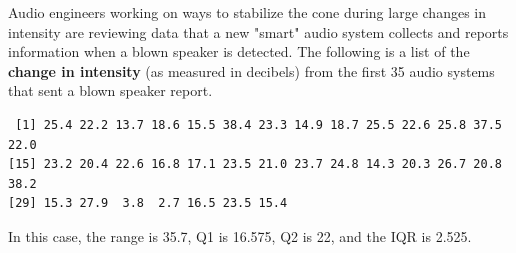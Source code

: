 \documentclass[addpoints]{examsetup}\usepackage[]{graphicx}\usepackage[]{color}
\makeatletter
\newenvironment{kframe}{%
 \def\at@end@of@kframe{}%
 \ifinner\ifhmode%
  \def\at@end@of@kframe{\end{minipage}}%
  \begin{minipage}{\columnwidth}%
 \fi\fi%
 \def\FrameCommand##1{\hskip\@totalleftmargin \hskip-\fboxsep
 \colorbox{shadecolor}{##1}\hskip-\fboxsep
     \hskip-\linewidth \hskip-\@totalleftmargin \hskip\columnwidth}%
 \MakeFramed {\advance\hsize-\width
   \@totalleftmargin\z@ \linewidth\hsize
   \@setminipage}}%
 {\par\unskip\endMakeFramed%
 \at@end@of@kframe}
\newenvironment{knitrout}{}{} %
\makeatother
\begin{document}
\begin{questions}
Audio engineers working on ways to stabilize the cone during large changes in intensity are reviewing data that a 
new "smart" audio system collects and reports information when a blown speaker is detected. 
The following is a list of the \textbf{change in intensity} (as measured in decibels) from the first 35 audio systems that sent a blown speaker report.

\begin{knitrout}
\color{fgcolor}\begin{kframe}
\begin{verbatim}
 [1] 25.4 22.2 13.7 18.6 15.5 38.4 23.3 14.9 18.7 25.5 22.6 25.8 37.5 22.0
[15] 23.2 20.4 22.6 16.8 17.1 23.5 21.0 23.7 24.8 14.3 20.3 26.7 20.8 38.2
[29] 15.3 27.9  3.8  2.7 16.5 23.5 15.4
\end{verbatim}
\end{kframe}
\end{knitrout}

In this case, the range is 35.7, Q1 is 16.575, Q2 is 22, and the IQR is 2.525.

\end{questions}
\end{document}
